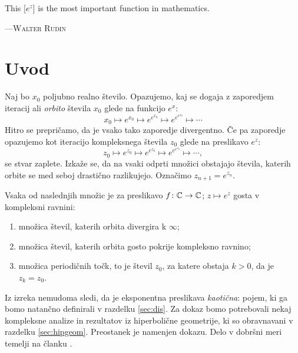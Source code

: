 \let\origthefootnote\thefootnote
\renewcommand{\thefootnote}{\fnsymbol{footnote}}

\epigraph{
    This \textup{[\(e^z\)]} is the most important function in mathematics.
    }{
        \textsc{---Walter Rudin}\footnotemark
    }
        

\let\thefootnote\origthefootnote

\section{Uvod} \label{sec:intro}

Naj bo \(x_0\) poljubno realno število. Opazujemo, kaj se dogaja z zaporedjem iteracij ali \emph{orbito} števila \(x_0\) glede na funkcijo \(e^{x}\):
\[x_0 \mapsto e^{x_0} \mapsto e^{e^{x_0}} \mapsto e^{e^{e^{x_0}}} \mapsto \cdots\]
Hitro se prepričamo, da je vsako tako zaporedje divergentno. Če pa zaporedje opazujemo kot iteracijo kompleksnega števila \(z_0\) glede na preslikavo \(e^z\):
\[z_0 \mapsto e^{z_0} \mapsto e^{e^{z_0}} \mapsto e^{e^{e^{z_0}}} \mapsto \cdots,\]
se stvar zaplete. Izkaže se, da na vsaki odprti množici obstajajo števila, katerih orbite se med seboj drastično razlikujejo. Označimo \(z_{n + 1} = e^{z_n}\).

\begin{izrek} \label{thm:orbits}
    Vsaka od naslednjih množic je za preslikavo \(f \colon \mathbb C \to \mathbb C\); \(z \mapsto e^{z}\) gosta v kompleksni ravnini:
    \begin{enumerate}
        \item množica števil, katerih orbita divergira k \(\infty\);
        \item množica števil, katerih orbita gosto pokrije kompleksno ravnino;
        \item množica periodičnih točk, to je števil \(z_0\), za katere obstaja \(k > 0\), da je \(z_k = z_0\).
    \end{enumerate}
\end{izrek}

\noindent Iz izreka nemudoma sledi, da je eksponentna preslikava \emph{kaotična}: pojem, ki ga bomo natančno definirali v razdelku \ref{sec:dis}. Za dokaz bomo potrebovali nekaj kompleksne analize in rezultatov iz hiperbolične geometrije, ki so obravnavani v razdelku \ref{sec:hipgeom}. Preostanek je namenjen dokazu. Delo v dobršni meri temelji na članku \cite{Shen_2015}.
